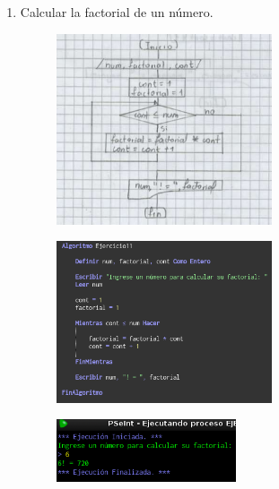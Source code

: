 \documentclass[12pt]{article}
\begin{document}
\begin{enumerate}
            \newpage 
            \item Calcular la factorial de un número.
            
                \begin{figure}[!h]
                    \centering
                    \includegraphics[width=0.6\textwidth]{Img/DF_ej11.png}
                \end{figure}

                \begin{figure}[!h]
                    \centering
                    \includegraphics[width=0.6\textwidth]{Img/Cod_ej11.png}
                \end{figure}

                \begin{figure}[!h]
                    \centering
                    \includegraphics[width=0.5\textwidth]{Img/Ejec_ej11.png}
                \end{figure}
        

\end{enumerate}
\end{document}
